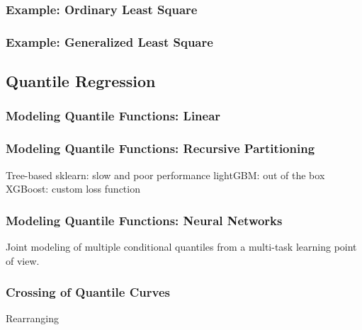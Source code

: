 \documentclass{beamer}
\begin{document}
\begin{frame}
\frametitle{Example: Ordinary Least Square}



\end{frame}


\begin{frame}
\frametitle{Example: Generalized Least Square}



\end{frame}


\subsection{Quantile Regression}

\begin{frame}
\frametitle{Modeling Quantile Functions: Linear}



\end{frame}


\begin{frame}
\frametitle{Modeling Quantile Functions: Recursive Partitioning}

Tree-based
sklearn: slow and poor performance
lightGBM: out of the box
XGBoost: custom loss function

\end{frame}


\begin{frame}
\frametitle{Modeling Quantile Functions: Neural Networks}

Joint modeling of multiple conditional quantiles from a multi-task learning point of view.

\end{frame}


\begin{frame}
\frametitle{Crossing of Quantile Curves}

Rearranging

\end{frame}

\end{document}
